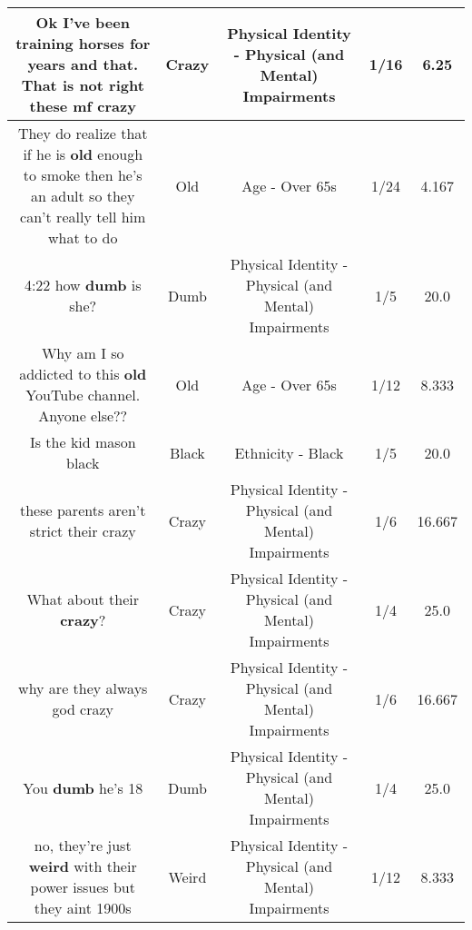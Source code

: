 \documentclass[11pt]{article}
\newlength\mylength
\begin{document}
\begin{center}
\begin{longtable}{|C{.65\mylength}|C{.30\mylength}|C{.12\mylength}|C{.12\mylength}|C{.12\mylength}|}
  \small Ok I've been training horses for years and that. That is not right these mf crazy\normalsize   & Crazy & Physical Identity - Physical (and Mental) Impairments & 1/16 & 6.25 \\  \hline
  \small They do realize that if he is \textbf{old} enough to smoke then he's an adult so they can't really tell him what to do\normalsize   & Old & Age - Over 65s & 1/24 & 4.167 \\  \hline
  \small 4:22 how \textbf{dumb} is she?\normalsize   & Dumb & Physical Identity - Physical (and Mental) Impairments & 1/5 & 20.0 \\  \hline
  \small Why am I so addicted to this \textbf{old} YouTube channel. Anyone else??\normalsize   & Old & Age - Over 65s & 1/12 & 8.333 \\  \hline
  \small Is the kid mason black\normalsize   & Black & Ethnicity - Black & 1/5 & 20.0 \\  \hline
  \small these parents aren't strict their crazy\normalsize   & Crazy & Physical Identity - Physical (and Mental) Impairments & 1/6 & 16.667 \\  \hline
  \small What about their \textbf{crazy}?\normalsize   & Crazy & Physical Identity - Physical (and Mental) Impairments & 1/4 & 25.0 \\  \hline
  \small why are they always god crazy\normalsize   & Crazy & Physical Identity - Physical (and Mental) Impairments & 1/6 & 16.667 \\  \hline
  \small You \textbf{dumb} he's 18\normalsize   & Dumb & Physical Identity - Physical (and Mental) Impairments & 1/4 & 25.0 \\  \hline
  \small no, they're just \textbf{weird} with their power issues but they aint 1900s\normalsize   & Weird & Physical Identity - Physical (and Mental) Impairments & 1/12 & 8.333 \\  \hline

\end{longtable}
\end{center}
\end{document}
